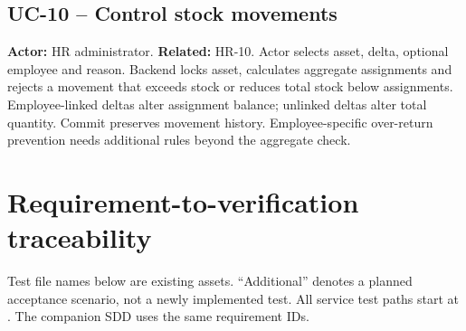 \documentclass[10pt,a4paper]{article}
\begin{document}
\subsection{UC-10 -- Control stock movements}
\textbf{Actor:} HR administrator. \textbf{Related:} HR-10.
Actor selects asset, delta, optional employee and reason. Backend locks asset,
calculates aggregate assignments and rejects a movement that exceeds stock or
reduces total stock below assignments. Employee-linked deltas alter assignment balance;
unlinked deltas alter total quantity. Commit preserves movement history.
Employee-specific over-return prevention needs additional rules beyond the aggregate check.

\clearpage
\section{Requirement-to-verification traceability}\label{app:trace}
Test file names below are existing assets. ``Additional'' denotes a planned acceptance
scenario, not a newly implemented test. All service test paths start at
. The companion SDD uses the same requirement IDs.
\small
\end{document}
